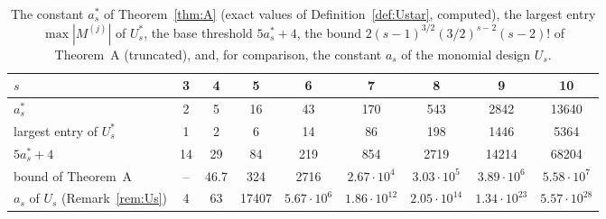 \documentclass[11pt]{amsart}
\theoremstyle{definition}
\theoremstyle{plain}
\begin{document}
\begin{table}[tbp]
\centering\small\setlength{\tabcolsep}{4pt}
\begin{tabular}{@{}lcccccccc@{}}
\toprule
$s$ & 3 & 4 & 5 & 6 & 7 & 8 & 9 & 10\\
\midrule
$a^*_s$ & 2 & 5 & 16 & 43 & 170 & 543 & 2842 & 13640\\
largest entry of $U^*_s$ & 1 & 2 & 6 & 14 & 86 & 198 & 1446 & 5364\\
$5a^*_s+4$ & 14 & 29 & 84 & 219 & 854 & 2719 & 14214 & 68204\\
bound of Theorem~A & -- & 46.7 & 324 & 2716 & $2.67\cdot10^4$ & $3.03\cdot10^5$ & $3.89\cdot10^6$ & $5.58\cdot10^7$\\
$a_s$ of $U_s$ (Remark~\ref{rem:Us}) & 4 & 63 & 17407 & $5.67\cdot10^6$ & $1.86\cdot10^{12}$ & $2.05\cdot10^{14}$ & $1.34\cdot10^{23}$ & $5.57\cdot10^{28}$\\
\bottomrule
\end{tabular}
\medskip
\caption{The constant $a^*_s$ of Theorem~\ref{thm:A} (exact values of Definition~\ref{def:Ustar}, computed), the largest entry $\max|M^{(j)}|$ of $U^*_s$, the base threshold $5a^*_s+4$, the bound $2(s-1)^{3/2}(3/2)^{s-2}(s-2)!$ of Theorem~A (truncated), and, for comparison, the constant $a_s$ of the monomial design $U_s$.}
\label{tab:astar}
\end{table}
\end{document}
